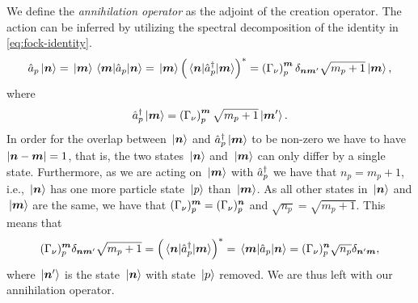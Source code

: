             We define the \emph{annihilation operator} as the adjoint of the
            creation operator.
            The action can be inferred by utilizing the spectral decomposition
            of the identity in \autoref{eq:fock-identity}.
            \begin{align}
                \hat{a}_{p}\ket*{\boldsymbol{n}}
                = \ket*{\boldsymbol{m}}\mel*{\boldsymbol{m}}{\hat{a}_{p}}{\boldsymbol{n}}
                =
                \ket*{\boldsymbol{m}}
                \left( 
                    \mel*{\boldsymbol{n}}{\hat{a}_{p}^{\dagger}}{\boldsymbol{m}}
                 \right)^{*}
                = \left( \Gamma_{\nu} \right)^{\boldsymbol{m}}_{p}
                \delta_{\boldsymbol{n}\boldsymbol{m}'}
                \sqrt{m_p + 1}
                \ket*{\boldsymbol{m}},
            \end{align}
            where
            \begin{align}
                \hat{a}_{p}^{\dagger}\ket*{\boldsymbol{m}}
                = \left( \Gamma_{\nu} \right)^{\boldsymbol{m}}_{p}
                \sqrt{m_p + 1}
                \ket*{\boldsymbol{m}'}.
            \end{align}
            In order for the overlap between $\ket*{\boldsymbol{n}}$ and
            $\hat{a}_{p}^{\dagger}\ket*{\boldsymbol{m}}$ to be non-zero we have to have $\abs{\boldsymbol{n}
            - \boldsymbol{m}} = 1$, that is, the two states $\ket*{\boldsymbol{n}}$ and
            $\ket*{\boldsymbol{m}}$ can only differ by a single state.
            Furthermore, as we are acting on $\ket*{\boldsymbol{m}}$ with $\hat{a}_{p}^{\dagger}$ we
            have that $n_p = m_p + 1$, i.e., $\ket*{\boldsymbol{n}}$ has one more
            particle state $\ket*{p}$ than $\ket*{\boldsymbol{m}}$.
            As all other states in $\ket*{\boldsymbol{n}}$ and $\ket*{\boldsymbol{m}}$ are the
            same, we have that $(\Gamma_{\nu})^{\boldsymbol{m}}_{p} =
            (\Gamma_{\nu})^{\boldsymbol{n}}_{p}$
            and $\sqrt{n_p} = \sqrt{m_p + 1}$.
            This means that
            \begin{align}
                (\Gamma_{\nu})^{\boldsymbol{m}}_{p}
                \delta_{\boldsymbol{n}\boldsymbol{m}'}
                \sqrt{m_p + 1}
                =
                \left( \mel*{\boldsymbol{n}}{\hat{a}_{p}^{\dagger}}{\boldsymbol{m}} \right)^{*}
                =
                \mel*{\boldsymbol{m}}{\hat{a}_{p}}{\boldsymbol{n}}
                =
                (\Gamma_{\nu})^{\boldsymbol{n}}_{p}
                \sqrt{n_p}
                \delta_{\boldsymbol{n}'\boldsymbol{m}},
            \end{align}
            where $\ket*{\boldsymbol{n}'}$ is the state $\ket*{\boldsymbol{n}}$ with state
            $\ket*{p}$ removed.
            We are thus left with our annihilation operator.
